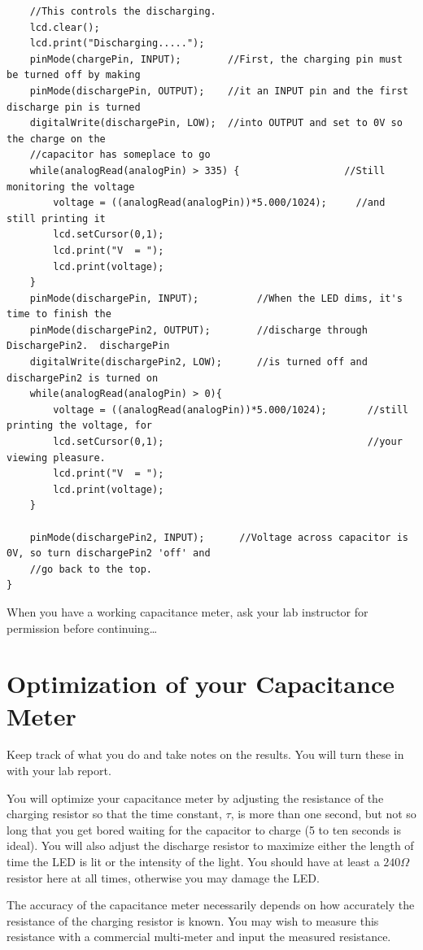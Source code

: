 \documentclass[]{article}
\begin{document}
\begin{verbatim}
	//This controls the discharging.  
	lcd.clear(); 
	lcd.print("Discharging.....");
	pinMode(chargePin, INPUT);        //First, the charging pin must be turned off by making 
	pinMode(dischargePin, OUTPUT);    //it an INPUT pin and the first discharge pin is turned 
	digitalWrite(dischargePin, LOW);  //into OUTPUT and set to 0V so the charge on the 
	//capacitor has someplace to go
	while(analogRead(analogPin) > 335) {                  //Still monitoring the voltage
		voltage = ((analogRead(analogPin))*5.000/1024);     //and still printing it    
		lcd.setCursor(0,1);
		lcd.print("V  = ");
		lcd.print(voltage);
	}
	pinMode(dischargePin, INPUT);          //When the LED dims, it's time to finish the 
	pinMode(dischargePin2, OUTPUT);        //discharge through DischargePin2.  dischargePin 
	digitalWrite(dischargePin2, LOW);      //is turned off and dischargePin2 is turned on 
	while(analogRead(analogPin) > 0){      
		voltage = ((analogRead(analogPin))*5.000/1024);       //still printing the voltage, for    
		lcd.setCursor(0,1);                                   //your viewing pleasure.
		lcd.print("V  = ");
		lcd.print(voltage);
	}
	
	pinMode(dischargePin2, INPUT);      //Voltage across capacitor is 0V, so turn dischargePin2 'off' and 
	//go back to the top.
}
\end{verbatim}

When you have a working capacitance meter, ask your lab instructor for permission before continuing\dots 



\section{Optimization of your Capacitance Meter}

Keep track of what you do and take notes on the results.  You will turn these in with your lab report.

You will  optimize your capacitance meter by adjusting the resistance of the charging resistor so that the time constant, $\tau$, is more than one second, but not so long that you get bored waiting for the capacitor  to charge (5 to ten seconds is ideal).  You will also adjust the discharge resistor to maximize either the length of time the LED is lit or the intensity of the light.  You should have at least a $240 \Omega$ resistor here at all times, otherwise you may damage the LED.

The accuracy of the capacitance meter necessarily depends on how accurately the resistance of the charging resistor is known.  You may wish to measure this resistance with a commercial multi-meter and input the measured resistance.  
\end{document}
